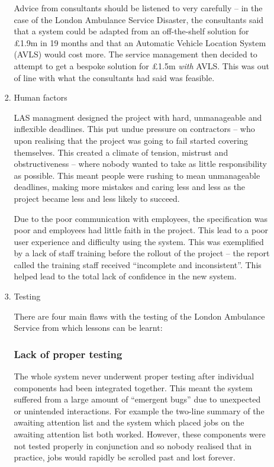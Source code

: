 \documentclass[10pt,\jkfside,a4paper]{article}
\begin{document}
\begin{enumerate}
\begin{enumerate}
\begin{enumerate}[label=(\roman*)]
Advice from consultants should be listened to very carefully -- in the case of the 
London Ambulance Service Disaster, the consultants said that a system could be adapted from an off-the-shelf 
solution for £1.9m in 19 months and that an Automatic Vehicle Location System (AVLS) would cost more. The service 
management then decided to attempt to get a bespoke solution for £1.5m \textit{with} AVLS. 
This was out of line with what the consultants had said was feasible.

\item Human factors

LAS managment designed the project with hard, unmanageable and inflexible deadlines. This put undue 
pressure on contractors -- who upon realising that the project was going to fail started covering themselves. 
This created a climate of tension, mistrust and obstructiveness -- where nobody wanted to take as 
little responsibility as possible. This meant people were rushing to mean unmanageable deadlines, making 
more mistakes and caring less and less as the project became less and less likely to succeed.

Due to the poor communication with employees, the specification was poor and employees had little faith in 
the project. This lead to a poor user experience 
and difficulty using the system. This was exemplified by a lack of staff training before the rollout of the 
project -- the report called the training staff received ``incomplete and inconsistent''. This helped lead to 
the total lack of confidence in the new system.

\item Testing

There are four main flaws with the testing of the London Ambulance Service from which lessons can be learnt:

\subsubsection*{Lack of proper testing}

The whole system never underwent proper testing after individual components had been integrated together. 
This meant the system suffered from a large amount of ``emergent bugs'' due to unexpected 
or unintended interactions. For example the two-line summary of the awaiting attention list 
and the system which placed jobs on the awaiting attention list both worked. However, these components 
were not tested properly in conjunction and so nobody realised that in practice, jobs would rapidly be scrolled 
past and lost forever.


\end{enumerate}
\end{enumerate}
\end{enumerate}
\end{document}
